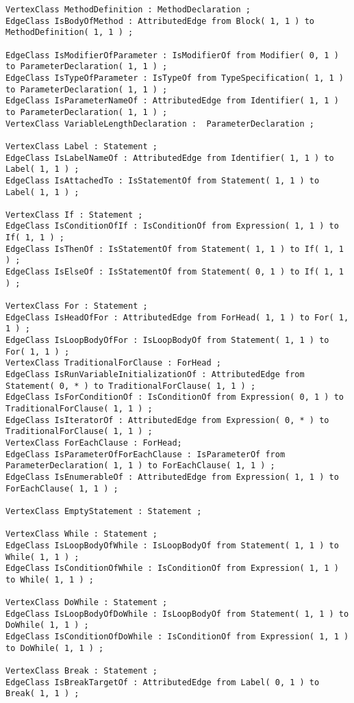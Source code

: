 \begin{lstlisting}[caption=Das im Javaextraktor eingesetzte Schema, label=schema_complete, captionpos=b, style=tgschema]
VertexClass MethodDefinition : MethodDeclaration ;
EdgeClass IsBodyOfMethod : AttributedEdge from Block( 1, 1 ) to MethodDefinition( 1, 1 ) ;

EdgeClass IsModifierOfParameter : IsModifierOf from Modifier( 0, 1 ) to ParameterDeclaration( 1, 1 ) ;
EdgeClass IsTypeOfParameter : IsTypeOf from TypeSpecification( 1, 1 ) to ParameterDeclaration( 1, 1 ) ;
EdgeClass IsParameterNameOf : AttributedEdge from Identifier( 1, 1 ) to ParameterDeclaration( 1, 1 ) ;
VertexClass VariableLengthDeclaration :  ParameterDeclaration ;

VertexClass Label : Statement ;
EdgeClass IsLabelNameOf : AttributedEdge from Identifier( 1, 1 ) to Label( 1, 1 ) ;
EdgeClass IsAttachedTo : IsStatementOf from Statement( 1, 1 ) to Label( 1, 1 ) ;

VertexClass If : Statement ;
EdgeClass IsConditionOfIf : IsConditionOf from Expression( 1, 1 ) to If( 1, 1 ) ;
EdgeClass IsThenOf : IsStatementOf from Statement( 1, 1 ) to If( 1, 1 ) ;
EdgeClass IsElseOf : IsStatementOf from Statement( 0, 1 ) to If( 1, 1 ) ;

VertexClass For : Statement ;
EdgeClass IsHeadOfFor : AttributedEdge from ForHead( 1, 1 ) to For( 1, 1 ) ;
EdgeClass IsLoopBodyOfFor : IsLoopBodyOf from Statement( 1, 1 ) to For( 1, 1 ) ;
VertexClass TraditionalForClause : ForHead ;
EdgeClass IsRunVariableInitializationOf : AttributedEdge from Statement( 0, * ) to TraditionalForClause( 1, 1 ) ;
EdgeClass IsForConditionOf : IsConditionOf from Expression( 0, 1 ) to TraditionalForClause( 1, 1 ) ;
EdgeClass IsIteratorOf : AttributedEdge from Expression( 0, * ) to TraditionalForClause( 1, 1 ) ;
VertexClass ForEachClause : ForHead;
EdgeClass IsParameterOfForEachClause : IsParameterOf from ParameterDeclaration( 1, 1 ) to ForEachClause( 1, 1 ) ;
EdgeClass IsEnumerableOf : AttributedEdge from Expression( 1, 1 ) to ForEachClause( 1, 1 ) ;

VertexClass EmptyStatement : Statement ;

VertexClass While : Statement ;
EdgeClass IsLoopBodyOfWhile : IsLoopBodyOf from Statement( 1, 1 ) to While( 1, 1 ) ;
EdgeClass IsConditionOfWhile : IsConditionOf from Expression( 1, 1 ) to While( 1, 1 ) ;

VertexClass DoWhile : Statement ;
EdgeClass IsLoopBodyOfDoWhile : IsLoopBodyOf from Statement( 1, 1 ) to DoWhile( 1, 1 ) ;
EdgeClass IsConditionOfDoWhile : IsConditionOf from Expression( 1, 1 ) to DoWhile( 1, 1 ) ;

VertexClass Break : Statement ;
EdgeClass IsBreakTargetOf : AttributedEdge from Label( 0, 1 ) to Break( 1, 1 ) ;


\end{lstlisting}
